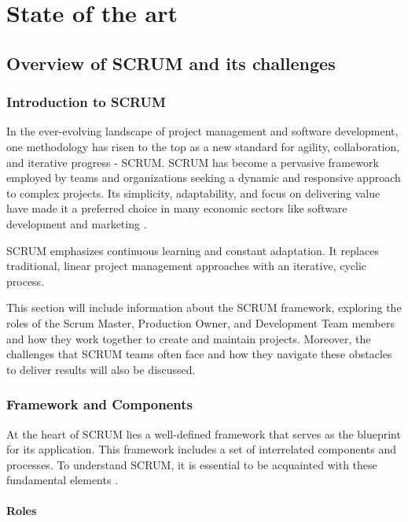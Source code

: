\chapter{State of the art}

\label{Chapter2}

\section{Overview of SCRUM and its challenges}
\subsection{Introduction to SCRUM}

In the ever-evolving landscape of project management and software development, 
one methodology has risen to the top as a new standard for agility, collaboration, 
and iterative progress - SCRUM. SCRUM has become a pervasive framework employed by 
teams and organizations seeking a dynamic and responsive approach to complex projects. 
Its simplicity, adaptability, and focus on delivering value have made it a preferred 
choice in many economic sectors like software development 
and marketing \parencite{AgileTransformationSurvey}.

SCRUM emphasizes continuous learning and constant adaptation. 
It replaces traditional, linear project management approaches with an iterative, cyclic process. 

This section will include information about the SCRUM framework,
exploring the roles of the Scrum Master, Production Owner,
and Development Team members and how they work together to create and maintain projects. 
Moreover, the challenges that SCRUM teams often face and how they navigate these 
obstacles to deliver results will also be discussed. 

\subsection{Framework and Components}

At the heart of SCRUM lies a well-defined framework that serves as the blueprint for its application. This framework includes a set of interrelated components and processes. To understand SCRUM, it is essential to be acquainted with these fundamental elements \parencite{TheScrumGuide}.

\subsubsection*{Roles}

